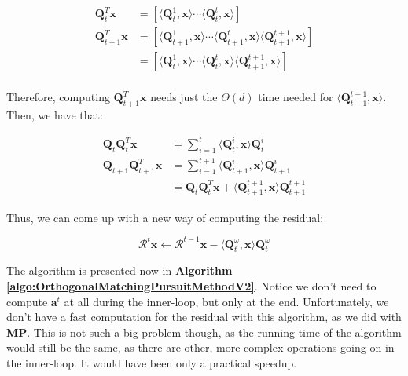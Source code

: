 \documentclass[12pt,a4paper,oneside,english]{UPBThesis}
\begin{document}
\begin{align*}
\textbf{Q}_t^T\textbf{x} & = [ \langle \textbf{Q}_t^1, \textbf{x} \rangle \cdots \langle \textbf{Q}_t^t, \textbf{x} \rangle ] \\
\textbf{Q}_{t+1}^T\textbf{x} & = [ \langle \textbf{Q}_{t+1}^1, \textbf{x} \rangle \cdots \langle \textbf{Q}_{t+1}^t, \textbf{x} \rangle \langle \textbf{Q}_{t+1}^{t+1}, \textbf{x} \rangle ] \\
& = [ \langle \textbf{Q}_t^1, \textbf{x} \rangle \cdots \langle \textbf{Q}_t^t, \textbf{x} \rangle \langle \textbf{Q}_{t+1}^{t+1}, \textbf{x} \rangle] \\
\end{align*}

Therefore, computing $\textbf{Q}_{t+1}^T\textbf{x}$ needs just the $\Theta(d)$ time needed for $\langle \textbf{Q}_{t+1}^{t+1}, \textbf{x} \rangle$. Then, we have that:

\begin{align*}
\textbf{Q}_t\textbf{Q}_t^T\textbf{x} & = \sum_{i=1}^t {\langle \textbf{Q}_t^i, \textbf{x} \rangle \textbf{Q}_t^i} \\
\textbf{Q}_{t+1}\textbf{Q}_{t+1}^T\textbf{x} & = \sum_{i=1}^{t+1} {\langle \textbf{Q}_{t+1}^i, \textbf{x} \rangle \textbf{Q}_{t+1}^i} \\
& = \textbf{Q}_t\textbf{Q}_t^T\textbf{x} + \langle \textbf{Q}_{t+1}^{t+1}, \textbf{x} \rangle \textbf{Q}_{t+1}^{t+1}
\end{align*}

Thus, we can come up with a new way of computing the residual:

\begin{equation*}
\mathcal{R}^t\textbf{x} \gets \mathcal{R}^{t-1}\textbf{x} - \langle \textbf{Q}_{t}^{\omega}, \textbf{x} \rangle \textbf{Q}_{t}^{\omega}
\end{equation*}

The algorithm is presented now in \textbf{Algorithm \ref{algo:OrthogonalMatchingPursuitMethodV2}}. Notice we don't need to compute $\textbf{a}^t$ at all during the inner-loop, but only at the end. Unfortunately, we don't have a fast computation for the residual with this algorithm, as we did with \textbf{MP}. This is not such a big problem though, as the running time of the algorithm would still be the same, as there are other, more complex operations going on in the inner-loop. It would have been only a practical speedup.
\end{document}
